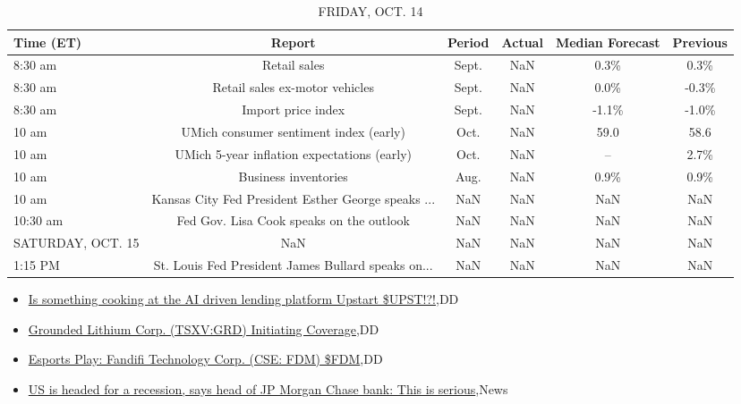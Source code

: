\documentclass{article}%
\begin{document}
%


\begin{table}[htbp]%
\caption{FRIDAY, OCT. 14}%
\centering%
\begin{adjustbox}{width=1\textwidth}%
\begin{tabular}{lccccc}
\toprule
        Time (ET) &                                             Report & Period & Actual & Median Forecast & Previous \\
\midrule
          8:30 am &                                       Retail sales &  Sept. &    NaN &            0.3\% &     0.3\% \\
          8:30 am &                     Retail sales ex-motor vehicles &  Sept. &    NaN &            0.0\% &    -0.3\% \\
          8:30 am &                                 Import price index &  Sept. &    NaN &           -1.1\% &    -1.0\% \\
            10 am &             UMich consumer sentiment index (early) &   Oct. &    NaN &            59.0 &     58.6 \\
            10 am &        UMich 5-year inflation expectations (early) &   Oct. &    NaN &              -- &     2.7\% \\
            10 am &                               Business inventories &   Aug. &    NaN &            0.9\% &     0.9\% \\
            10 am & Kansas City Fed President Esther George speaks ... &    NaN &    NaN &             NaN &      NaN \\
         10:30 am &           Fed Gov. Lisa Cook speaks on the outlook &    NaN &    NaN &             NaN &      NaN \\
SATURDAY, OCT. 15 &                                                NaN &    NaN &    NaN &             NaN &      NaN \\
          1:15 PM & St. Louis Fed President James Bullard speaks on... &    NaN &    NaN &             NaN &      NaN \\
\bottomrule
\end{tabular}
%
\end{adjustbox}%
\end{table}

%
\begin{itemize}%
\item%
\href{https://reddit.com/r/wallstreetbets/comments/y18gb2/is\_something\_cooking\_at\_the\_ai\_driven\_lending/}{Is something cooking at the AI driven lending platform Upstart \$UPST!?!},DD%
\item%
\href{https://reddit.com/r/Baystreetbets/comments/y1902y/grounded\_lithium\_corp\_tsxvgrd\_initiating\_coverage/}{Grounded Lithium Corp. (TSXV:GRD) Initiating Coverage},DD%
\item%
\href{https://reddit.com/r/Baystreetbets/comments/y0h21w/esports\_play\_fandifi\_technology\_corp\_cse\_fdm\_fdm/}{Esports Play: Fandifi Technology Corp. (CSE: FDM) \$FDM},DD%
\item%
\href{https://reddit.com/r/Economics/comments/y16zt3/us\_is\_headed\_for\_a\_recession\_says\_head\_of\_jp/}{US is headed for a recession, says head of JP Morgan Chase bank: This is serious},News%
\end{itemize}%
\end{document}
